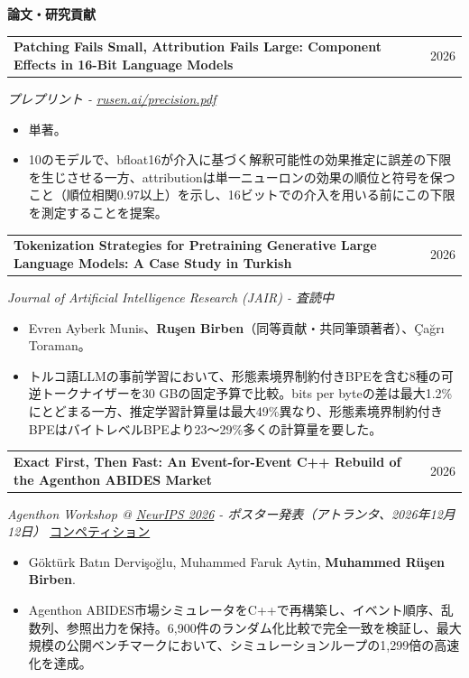 \documentclass[11pt,a4paper]{article}
\makeatletter
\newcommand{\cvlink}[2]{\href{#1}{\textcolor{linkblue}{#2}}}
\newcommand{\cvsection}[3][5]{%
  \par\Needspace*{#1\baselineskip}\vspace{6pt}%
  {\bfseries\fontsize{11}{13}\selectfont #3}\par\nobreak
  \vspace{3pt}{\color{muted}\hrule height 0.4pt}\nobreak\vspace{6pt}%
}
\newcommand{\cvheading}[2]{%
  \begin{tabularx}{\linewidth}{@{}>{\raggedright\arraybackslash}X@{\hspace{10pt}}r@{}}%
  \textbf{#1} & {\small\color{muted}#2}\\
  \end{tabularx}\par\nobreak
}
\newenvironment{cvpoints}{\begin{itemize}[leftmargin=12pt,itemsep=2pt,topsep=2pt,parsep=0pt]\small}{\end{itemize}}
\makeatother
\begin{document}
\cvsection{}{論文・研究貢献}
\begin{minipage}{\linewidth}\raggedright
\cvheading{Patching Fails Small, Attribution Fails Large: Component Effects in 16-Bit Language Models}{2026}
{\small{}\itshape{}\color{muted}プレプリント - \cvlink{https://rusen.ai/precision.pdf}{rusen.ai/precision.pdf}}\hfill{\small{}%
%
}\par\vspace{2pt}
\begin{cvpoints}
\item 単著。
\item 10のモデルで、bfloat16が介入に基づく解釈可能性の効果推定に誤差の下限を生じさせる一方、attributionは単一ニューロンの効果の順位と符号を保つこと（順位相関0.97以上）を示し、16ビットでの介入を用いる前にこの下限を測定することを提案。
\end{cvpoints}
\end{minipage}\par\vspace{5pt}
\begin{minipage}{\linewidth}\raggedright
\cvheading{Tokenization Strategies for Pretraining Generative Large Language Models: A Case Study in Turkish}{2026}
{\small{}\itshape{}\color{muted}Journal of Artificial Intelligence Research (JAIR) - 査読中}\hfill{\small{}%
%
}\par\vspace{2pt}
\begin{cvpoints}
\item Evren Ayberk Munis、\textbf{Ruşen Birben}（同等貢献・共同筆頭著者）、Çağrı Toraman。
\item トルコ語LLMの事前学習において、形態素境界制約付きBPEを含む8種の可逆トークナイザーを30 GBの固定予算で比較。bits per byteの差は最大1.2\%にとどまる一方、推定学習計算量は最大49\%異なり、形態素境界制約付きBPEはバイトレベルBPEより23〜29\%多くの計算量を要した。
\end{cvpoints}
\end{minipage}\par\vspace{5pt}
\begin{minipage}{\linewidth}\raggedright
\cvheading{Exact First, Then Fast: An Event-for-Event C++ Rebuild of the Agenthon ABIDES Market}{2026}
{\small{}\itshape{}\color{muted}Agenthon Workshop @ \cvlink{https://neurips.cc/Conferences/2026}{NeurIPS 2026} - ポスター発表（アトランタ、2026年12月12日）}\hfill{\small{}%
\mbox{\cvlink{https://www.agenthon.net/}{コンペティション}}%
}\par\vspace{2pt}
\begin{cvpoints}
\item Göktürk Batın Dervişoğlu, Muhammed Faruk Aytin, \textbf{Muhammed Rüşen Birben}.
\item Agenthon ABIDES市場シミュレータをC++で再構築し、イベント順序、乱数列、参照出力を保持。6,900件のランダム化比較で完全一致を検証し、最大規模の公開ベンチマークにおいて、シミュレーションループの1,299倍の高速化を達成。
\end{cvpoints}
\end{minipage}\par\vspace{5pt}
\end{document}
